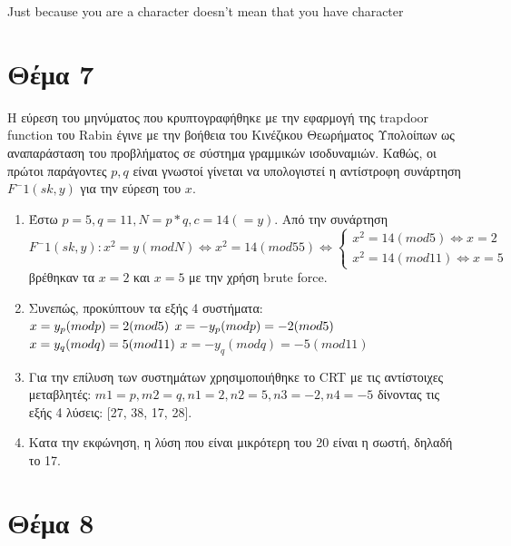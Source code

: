 \documentclass[a4paper, 11pt]{article}
\newcommand{\lt}{\latintext}
\begin{document}
{\lt  Just because you are a character doesn't mean that you have character}

\section*{Θέμα 7}


Η εύρεση του μηνύματος που κρυπτογραφήθηκε με την εφαρμογή της {\lt trapdoor function} του {\lt Rabin} έγινε με την βοήθεια του Κινέζικου Θεωρήματος Υπολοίπων ως αναπαράσταση του προβλήματος σε σύστημα γραμμικών ισοδυναμιών. Καθώς, οι πρώτοι παράγοντες $p, q$ είναι γνωστοί γίνεται να υπολογιστεί η αντίστροφη συνάρτηση $ F^-1(sk, y) $ για την εύρεση του $x$. 

\begin{enumerate}

\item Έστω $ p = 5, q = 11, N = p * q, c = 14 (=y) $. Από την συνάρτηση $ F^-1(sk,y): x^2 = y (mod N) \Leftrightarrow x^ 2 = 14 (mod 55) \Leftrightarrow
\left\{
	\begin{array}{ll}
		x^2 = 14 (mod 5) \Leftrightarrow x = 2\\
		x^2 = 14 (mod 11) \Leftrightarrow x = 5
	\end{array}
\right.$ βρέθηκαν τα $ x = 2 $ και $ x =5 $ με την χρήση {\lt brute force}. 

\item Συνεπώς, προκύπτουν τα εξής 4 συστήματα: \\
$ x = y_p (mod p) = 2 (mod 5) \\ $
$ x = -y_p (mod p) = -2 (mod 5) \\ $
$ x = y_q (mod q) = 5 (mod 11) \\ $
$ x = -y_q (mod q) = -5 (mod 11)$

\item Για την επίλυση των συστημάτων χρησιμοποιήθηκε το {\lt CRT} με τις αντίστοιχες μεταβλητές: $ m1 = p, m2 = q, n1 = 2 , n2 = 5, n3 = -2, n4 = -5 $ δίνοντας τις εξής 4 λύσεις: [27, 38, 17, 28].

\item Κατα την εκφώνηση, η λύση που είναι μικρότερη του 20 είναι η σωστή, δηλαδή το 17.

\end{enumerate}


\section*{Θέμα 8}
\end{document}
